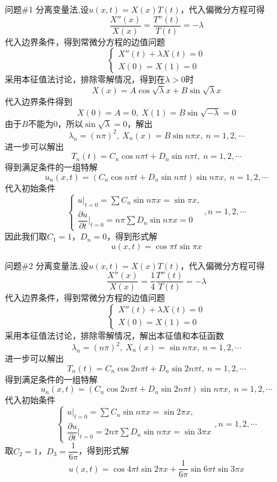 \documentclass[12pt]{ctexart}
\begin{document}
    \begin{problem}{问题\#1}
        分离变量法,设$u(x,t)=X(x)T(t)$，代入偏微分方程可得
        $$
        \dfrac{X''(x)}{X(x)}=\dfrac{T''(t)}{T(t)}=-\lambda
        $$
        代入边界条件，得到常微分方程的边值问题
        $$
        \begin{cases}
            X''(t)+\lambda X(t)=0\\
            X(0)=X(1)=0
        \end{cases}
        $$
        采用本征值法讨论，排除零解情况，得到在$\lambda >0$时
        $$
        X(x)=A\cos\sqrt{\lambda}x+B\sin\sqrt{\lambda}x
        $$
        代入边界条件得到
        $$
        X(0)=A=0,\ X(1)=B\sin\sqrt{-\lambda}=0
        $$
        由于$B$不能为0，所以$\sin\sqrt{\lambda}=0$，解出
        $$
        \lambda_n=(n\pi)^2,\ X_n(x)=B\sin n\pi x,\ n=1,2,\cdots
        $$
        进一步可以解出
        $$
        T_n(t)=C_n\cos n\pi t+D_n\sin n\pi t,\ n=1,2,\cdots
        $$
        得到满足条件的一组特解
        $$
        u_n(x,t)=(C_n\cos n\pi t+D_n\sin n\pi t)\sin n\pi x,\ n=1,2,\cdots
        $$
        代入初始条件
        $$
        \begin{cases}
            u|_{t=0}=\sum C_n\sin n\pi x=\sin \pi x,\\
            \dfrac{\partial u}{\partial t}|_{t=0} =n\pi\sum D_n\sin n\pi x=0 
        \end{cases}
        ,n=1,2,\cdots
        $$
        因此我们取$C_1=1$，$D_n=0$，得到形式解 
        $$
        u(x,t)=\cos\pi t\sin \pi x
        $$
    \end{problem}
    \begin{problem}{问题\#2}
        分离变量法,设$u(x,t)=X(x)T(t)$，代入偏微分方程可得
        $$
        \dfrac{X''(x)}{X(x)}=\dfrac{1}{4}\dfrac{T''(t)}{T(t)}=-\lambda
        $$
        代入边界条件，得到常微分方程的边值问题
        $$
        \begin{cases}
            X''(t)+\lambda X(t)=0\\
            X(0)=X(1)=0
        \end{cases}
        $$
        采用本征值法讨论，排除零解情况，解出本征值和本征函数
        $$
        \lambda_n=(n\pi)^2,\ X_n(x)=\sin n\pi x,\ n=1,2,\cdots
        $$
        进一步可以解出
        $$
        T_n(t)=C_n\cos 2n\pi t+D_n\sin 2n\pi t,\ n=1,2,\cdots
        $$
        得到满足条件的一组特解
        $$
        u_n(x,t)=(C_n\cos 2n\pi t+D_n\sin 2n\pi t)\sin n\pi x,\ n=1,2,\cdots
        $$
        代入初始条件
        $$
        \begin{cases}
            u|_{t=0}=\sum C_n\sin n\pi x=\sin 2\pi x,\\
            \dfrac{\partial u}{\partial t}|_{t=0}=2n\pi\sum D_n\sin n\pi x=\sin 3\pi x
        \end{cases}
        ,n=1,2,\cdots
        $$
        取$C_2=1$，$D_3=\dfrac{1}{6\pi}$，得到形式解
        $$
        u(x,t)=\cos4\pi t\sin2\pi x+\dfrac{1}{6\pi}\sin6\pi t\sin3\pi x
        $$
    \end{problem}
\end{document}
